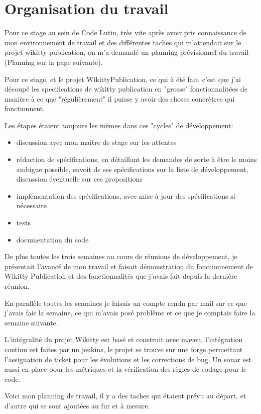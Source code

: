 \section{Organisation du travail}

Pour ce stage au sein de Code Lutin, très vite après avoir pris connaissance 
de mon environnement de travail et des différentes taches qui m'attendait sur
le projet wikitty publication, on m'a demandé un planning prévisionnel du travail
(Planning sur la page suivante).

Pour ce stage, et le projet WikittyPublication, ce qui à été fait, c'est que 
j'ai découpé les specifications de wikitty publication en "grosse" fonctionnalitées
de manière à ce que "régulièrement" il puisse y avoir des choses concrètres qui 
fonctionnent.

Les étapes étaient toujours les mêmes dans ces "cycles" de développement:
\begin{itemize}
\item discussion avec mon maitre de stage sur les attentes
\item rédaction de spécifications, en détaillant les demandes de sorte à être
le moins ambigue possible, envoit de ses spécifications sur la liste de 
développement, discussion éventuelle sur ces propositions
\item implémentation des spécifications, avec mise à jour des spécifications 
si nécessaire
\item tests
\item documentation du code
\end{itemize}

De plus toutes les trois semaines au cours de réunions de développement, je 
présentait l'avancé de mon travail et faisait démonstration du fonctionnement
de Wikitty Publication et des fonctionnalités que j'avais fait depuis la dernière
réunion.

En parallèle toutes les semaines je faisais un compte rendu par mail sur ce que 
j'avais fais la semaine, ce qui m'avais posé problème et ce que je comptais faire
la semaine suivante. 

L'intégralité du projet Wikitty est basé et construit avec maven, l'intégration
continu est faites par un jenkins, le projet se trouve sur une forge permettant
l'assignation de ticket pour les évolutions et les corrections de bug. 
Un sonar est aussi en place pour les métriques et la vérification des règles
de codage pour le code.

Voici mon planning de travail, il y a des taches qui étaient prévu au départ,
et d'autre qui se sont ajoutées au fur et à mesure. 

 


